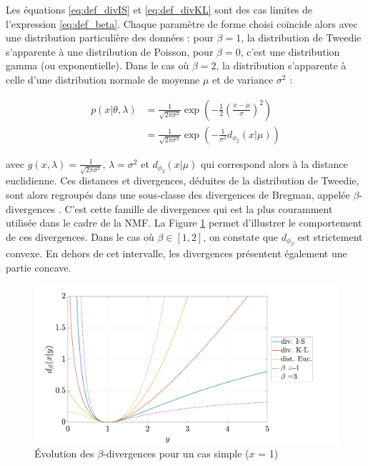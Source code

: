 Les équations \ref{eq:def_divIS} et \ref{eq:def_divKL} sont des cas limites de l'expression \ref{eq:def_beta}. Chaque paramètre de forme choisi coïncide alors avec une distribution particulière des données : pour $\beta = 1$, la distribution de Tweedie s'apparente à une distribution de Poisson, pour $\beta = 0$, c'est une distribution gamma (ou exponentielle). Dans le cas où $\beta = 2$, la distribution s'apparente à celle d'une distribution normale de moyenne $\mu$ et de variance $\sigma^2$ :

\begin{align}
p(x \vert \theta, \lambda) & = \frac{1}{\sqrt{2 \pi \sigma^2}}\exp\left(-\frac{1}{2} \left(\frac{x-\mu}{\sigma} \right)^2 \right)\\
& = \frac{1}{\sqrt{2 \pi \sigma^2}}\exp\left(-\frac{1}{\sigma^2}  d_{\phi_{2}}(x\vert \mu) \right)
\end{align}

avec $g(x,\lambda) = \frac{1}{\sqrt{2 \pi \sigma^2}}$, $\lambda = \sigma^2$ et $d_{\phi_{2}}(x\vert \mu)$ qui correspond alors à la distance euclidienne. Ces distances et divergences, déduites de la distribution de Tweedie, sont alors regroupés dans une sous-classe des divergences de Bregman, appelée $\beta$-divergences \cite{hennequin_beta-divergence_2011}. C'est cette famille de divergences qui est la plus couramment utilisée dans le cadre de la NMF. La Figure \ref{fig:allure-divergence} permet d'illustrer le comportement de ces divergences. Dans le cas où $\beta \in \left[ 1,2 \right]$, on constate que $d_{\phi_{\beta}}$ est strictement convexe. En dehors de cet intervalle, les divergences présentent également une partie concave. \\

\begin{figure}[h]
\centering
\includegraphics[width=.7\textwidth]{./figures/NMF/betaDiv_exemple.pdf}
\caption{Évolution des $\beta$-divergences pour un cas simple ($x$ = 1)}
\label{fig:allure-divergence}
\end{figure}

